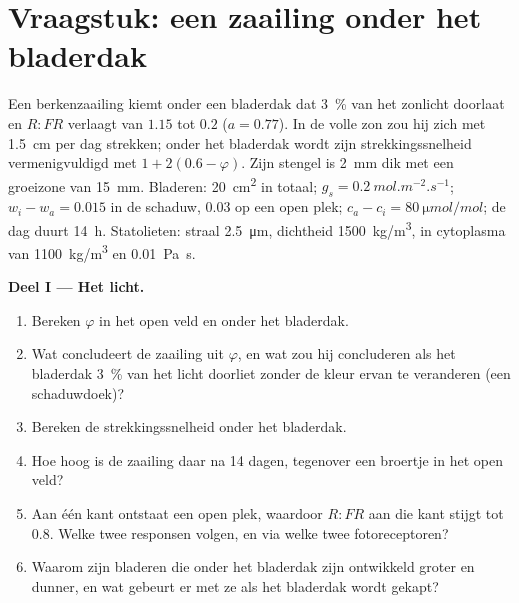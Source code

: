 \section{Vraagstuk: een zaailing onder het bladerdak}

\begin{problem}
\label{pb:b2:plant-plasticity:1}
Een berkenzaailing kiemt onder een bladerdak dat \qty{3}{\%} van het
zonlicht doorlaat en $R{:}FR$ verlaagt van $1.15$ tot $0.2$
($a = 0.77$). In de volle zon zou hij zich met \qty{1.5}{cm} per dag
strekken; onder het bladerdak wordt zijn strekkingssnelheid vermenigvuldigd
met $1 +
2(0.6 - \varphi)$. Zijn stengel is \qty{2}{mm} dik met een groeizone van
\qty{15}{mm}. Bladeren: \qty{20}{cm^2} in totaal; $g_s =
\qty{0.2}{mol.m^{-2}.s^{-1}}$; $w_i - w_a = 0.015$ in de schaduw,
$0.03$ op een open plek; $c_a - c_i = \qty{80}{\micro mol/mol}$; de dag
duurt \qty{14}{h}. Statolieten: straal \qty{2.5}{\micro m}, dichtheid
\qty{1500}{kg/m^3}, in cytoplasma van \qty{1100}{kg/m^3} en
\qty{0.01}{Pa.s}.

\medskip
\noindent\textbf{Deel I --- Het licht.}
\begin{enumerate}
  \item Bereken $\varphi$ in het open veld en onder het bladerdak.
  \item Wat concludeert de zaailing uit $\varphi$, en wat zou hij
        concluderen als het bladerdak \qty{3}{\%} van het licht doorliet
        zonder de kleur ervan te veranderen (een schaduwdoek)?
  \item Bereken de strekkingssnelheid onder het bladerdak.
  \item Hoe hoog is de zaailing daar na 14 dagen, tegenover een broertje in
        het open veld?
  \item Aan één kant ontstaat een open plek, waardoor $R{:}FR$ aan die kant
        stijgt tot
        $0.8$. Welke twee responsen volgen, en via welke twee
        fotoreceptoren?
  \item Waarom zijn bladeren die onder het bladerdak zijn ontwikkeld groter
        en dunner, en wat gebeurt er met ze als het bladerdak wordt gekapt?
\end{enumerate}


\end{problem}
